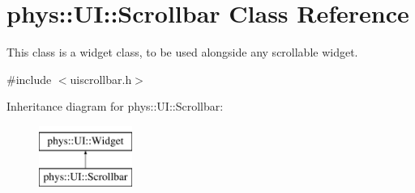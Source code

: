 \hypertarget{classphys_1_1UI_1_1Scrollbar}{
\section{phys::UI::Scrollbar Class Reference}
\label{d0/d3e/classphys_1_1UI_1_1Scrollbar}
}


This class is a widget class, to be used alongside any scrollable widget.  




{\ttfamily \#include $<$uiscrollbar.h$>$}

Inheritance diagram for phys::UI::Scrollbar:\begin{figure}[H]
\begin{center}
\leavevmode
\includegraphics[height=2.000000cm]{d0/d3e/classphys_1_1UI_1_1Scrollbar}
\end{center}
\end{figure}
